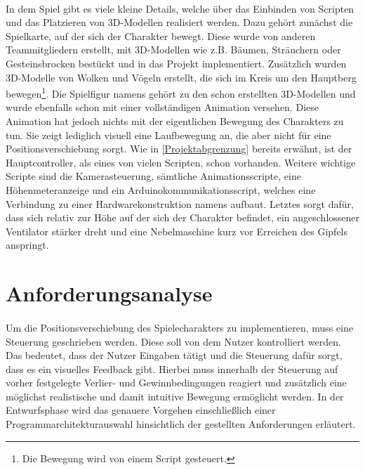 \paragraph{}
In dem Spiel gibt es viele kleine Details, welche über das Einbinden von Scripten und das Platzieren von 3D-Modellen realisiert werden. Dazu gehört zunächst die Spielkarte, auf der sich der Charakter bewegt. Diese wurde von anderen Teammitgliedern erstellt, mit 3D-Modellen wie z.B. Bäumen, Sträuchern oder Gesteinsbrocken bestückt und in das Projekt implementiert. Zusätzlich wurden 3D-Modelle von Wolken und Vögeln erstellt, die sich im Kreis um den Hauptberg bewegen\footnote{Die Bewegung wird von einem Script gesteuert.}.
Die Spielfigur namens  gehört zu den schon erstellten 3D-Modellen und wurde ebenfalls schon mit einer vollständigen Animation versehen. Diese Animation hat jedoch nichts mit der eigentlichen Bewegung des Charakters zu tun. Sie zeigt lediglich visuell eine Laufbewegung an, die aber nicht für eine Positionsverschiebung sorgt. 
Wie in \autoref{Projektabgrenzung}  bereits erwähnt, ist der Hauptcontroller, als eines von vielen Scripten, schon vorhanden. Weitere wichtige Scripte sind die Kamerasteuerung, sämtliche Animationsscripte, eine Höhenmeteranzeige und ein Arduinokommunikationsscript, welches eine Verbindung zu einer Hardwarekonstruktion namens  aufbaut. Letztes sorgt dafür, dass sich relativ zur Höhe auf der sich der Charakter befindet, ein angeschlossener Ventilator stärker dreht und eine Nebelmaschine kurz vor Erreichen des Gipfels anspringt.

\section{Anforderungsanalyse}
\paragraph{}
Um die Positionsverschiebung des Spielecharakters zu implementieren, muss eine Steuerung geschrieben werden. Diese soll von dem Nutzer kontrolliert werden. Das bedeutet, dass der Nutzer Eingaben tätigt und die Steuerung dafür sorgt, dass es ein visuelles Feedback gibt. Hierbei muss innerhalb der Steuerung auf vorher festgelegte Verlier- und Gewinnbedingungen reagiert und zusätzlich eine möglichst realistische und damit intuitive Bewegung ermöglicht werden. In der Entwurfsphase wird das genauere Vorgehen einschließlich einer Programmarchitekturauswahl hinsichtlich der gestellten Anforderungen erläutert.

